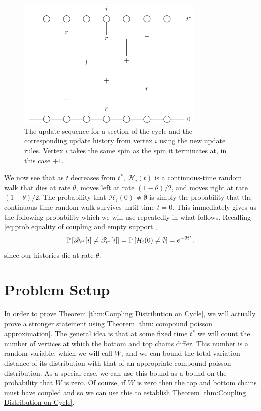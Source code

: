 	\begin{figure}
		\centering
		\includegraphics[width = 0.8\textwidth]{Figures/IsingCouplingTime/example_percolation_construction_rightleft.pdf}
		\caption[The update sequence for a section of the cycle and the corresponding update history from vertex i using the new update rules.]{The update sequence for a section of the cycle and the corresponding update history from vertex $i$ using the new update rules. Vertex $i$ takes the same spin as the spin it terminates at, in this case $+1$.}
		\label{fig:example percolation construction rightleft}
	\end{figure}

	We now see that as $t$ decreases from $t^*$, $\mathcal{H}_i(t)$ is a continuous-time random walk that dies at rate $\theta$, moves left at rate $(1 - \theta)/2$, and moves right at rate $(1 - \theta)/2$. The probability that $\mathcal{H}_i(0) \neq \emptyset$ is simply the probability that the continuous-time random walk survives until time $t = 0$. This immediately gives us the following probability which we will use repeatedly in what follows. Recalling \eqref{eq:prob equality of coupling and empty support},
	\begin{equation}
		\mathbb{P} \left[ \mathscr{B}_{t^*}[i] \neq \mathscr{T}_{t^*}[i] \right] = 
		\mathbb{P} \left[ \mathcal{H}_i(0) \neq \emptyset \right] = 
		e^{-\theta t^*}.
		\label{eq:1D bernoulli prob}
	\end{equation}
	since our histories die at rate $\theta$.

	\section{Problem Setup}
	\label{sec:1D problem setup}
	In order to prove Theorem \ref{thm:Coupling Distribution on Cycle}, we will actually prove a stronger statement using Theorem \ref{thm: compound poisson approximation}. The general idea is that at some fixed time $t^*$ we will count the number of vertices at which the bottom and top chains differ. This number is a random variable, which we will call $W$, and we can bound the total variation distance of its distribution with that of an appropriate compound poisson distribution. As a special case, we can use this bound as a bound on the probability that $W$ is zero. Of course, if $W$ is zero then the top and bottom chains must have coupled and so we can use this to establish Theorem \ref{thm:Coupling Distribution on Cycle}.

